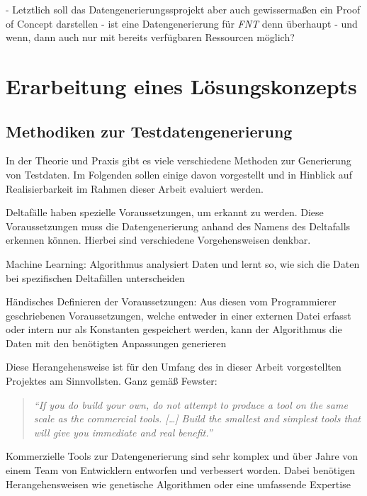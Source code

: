 - Letztlich soll das Datengenerierungssprojekt aber auch gewissermaßen ein Proof of Concept darstellen - ist eine Datengenerierung für \textit{FNT} denn überhaupt - und wenn, dann auch nur mit bereits verfügbaren Ressourcen möglich?

\section{Erarbeitung eines Lösungskonzepts}\label{sec:loesungskonzept}

\subsection{Methodiken zur Testdatengenerierung}\label{subsec:methodiken}
In der Theorie und Praxis gibt es viele verschiedene Methoden zur Generierung von Testdaten. Im Folgenden sollen einige davon vorgestellt und in Hinblick auf Realisierbarkeit im Rahmen dieser Arbeit evaluiert werden.

Deltafälle haben spezielle Voraussetzungen, um erkannt zu werden. Diese Voraussetzungen muss die Datengenerierung anhand des Namens des Deltafalls erkennen können. Hierbei sind verschiedene Vorgehensweisen denkbar. 

Machine Learning: Algorithmus analysiert Daten und lernt so, wie sich die Daten bei spezifischen Deltafällen unterscheiden

Händisches Definieren der Voraussetzungen: Aus diesen vom Programmierer geschriebenen Voraussetzungen, welche entweder in einer externen Datei erfasst oder intern nur als Konstanten gespeichert werden, kann der Algorithmus die Daten mit den benötigten Anpassungen generieren

Diese Herangehensweise ist für den Umfang des in dieser Arbeit vorgestellten Projektes am Sinnvollsten. Ganz gemäß Fewster:

\begin{quote}
    \textit{\enquote{If you do build your own, do not attempt to produce a tool on the same scale as the commercial tools. [\dots] Build the smallest and simplest tools that will give you immediate and real benefit.} \cite{fewster:1999}}
\end{quote}

Kommerzielle Tools zur Datengenerierung sind sehr komplex und über Jahre von einem Team von Entwicklern entworfen und verbessert worden. Dabei benötigen Herangehensweisen wie genetische Algorithmen oder eine umfassende Expertise 

